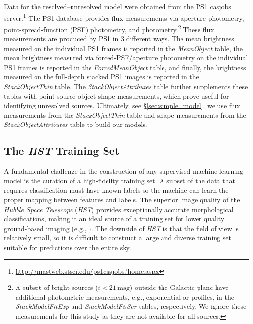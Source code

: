 \documentclass[twocolumn]{aastex62}
\begin{document}
\begin{CJK*}{UTF8}{gbsn}
Data for the resolved--unresolved model were obtained from the PS1 casjobs
server.\footnote{\url{http://mastweb.stsci.edu/ps1casjobs/home.aspx}} The
PS1 database provides flux measurements via aperture photometry,
point-spread-function (PSF) photometry, and \citet{Kron80}
photometry.\footnote{A subset of bright sources ($i < 21\,\mathrm{mag}$)
outside the Galactic plane have additional photometric measurements, e.g.,
exponential or \citet{Sersic63} profiles, in the \textit{StackModelFitExp}
and \textit{StackModelFitSer} tables, respectively. We ignore these
measurements for this study as they are not available for all sources.}
These flux measurements are produced by PS1 in 3 different ways. The mean
brightness measured on the individual PS1 frames is reported in the
\textit{MeanObject} table, the mean brightness measured via
forced-PSF/aperture photometry on the individual PS1 frames is reported in
the \textit{ForcedMeanObject} table, and finally, the brightness measured on
the full-depth stacked PS1 images is reported in the
\textit{StackObjectThin} table. The \textit{StackObjectAttributes} table
further supplements these tables with point-source object shape
measurements, which prove useful for identifying unresolved sources.
Ultimately, see \S\ref{sec:simple_model}, we use flux measurements from the
\textit{StackObjectThin} table and shape measurements from the
\textit{StackObjectAttributes} table to build our models.

\subsection{The \textit{HST} Training Set} \label{sec:hst_train}

A fundamental challenge in the construction of any supervised machine learning
model is the curation of a high-fidelity training set. A subset of the data
that requires classification must have known labels so the machine can learn
the proper mapping between features and labels. The superior image quality of
the \textit{Hubble Space Telescope} (\textit{HST}) provides exceptionally
accurate morphological classifications, making it an ideal source of a training
set for lower quality ground-based imaging (e.g., \citealt{Lupton01}). The
downside of \textit{HST} is that the field of view is relatively small, so it
is difficult to construct a large and diverse training set suitable for
predictions over the entire sky.


\end{CJK*}
\end{document}
